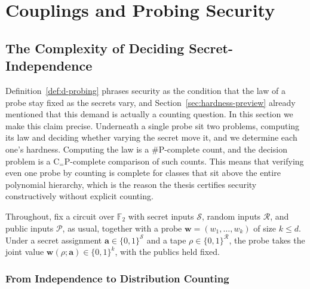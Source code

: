 \setlength{\parindent}{0pt}
\chapter{Couplings and Probing Security}
\label{chap:couplings}
\section{The Complexity of Deciding Secret-Independence}
\label{sec:hardness}

Definition~\ref{def:d-probing} phrases security as the condition that the law of a
probe stay fixed as the secrets vary, and Section~\ref{sec:hardness-preview}
already mentioned that this demand is actually a counting question. In this section we make
this claim precise. Underneath a single probe sit two problems, computing its law
and deciding whether varying the secret move it, and we determine each one's hardness. Computing the law
is a $\#\mathrm{P}$-complete count, and the decision problem is a
$\mathrm{C}_{=}\mathrm{P}$-complete comparison of such counts. This means
that verifying even one probe by counting is complete for classes that
sit above the entire polynomial hierarchy, which is the reason the thesis certifies
security constructively without explicit counting.

Throughout, fix a circuit over $\mathbb{F}_2$ with secret inputs $\mathcal{S}$,
random inputs $\mathcal{R}$, and public inputs $\mathcal{P}$, as usual, together with a probe
$\mathbf{w} = (w_1, \dots, w_k)$ of size $k \le d$. Under a secret assignment
$\mathbf{a} \in \{0,1\}^{\mathcal{S}}$ and a tape
$\rho \in \{0,1\}^{\mathcal{R}}$, the probe takes the joint value
$\mathbf{w}(\rho; \mathbf{a}) \in \{0,1\}^{k}$, with the publics held fixed.

  \subsection{From Independence to Distribution Counting}
  \label{sec:indep-to-counting}

